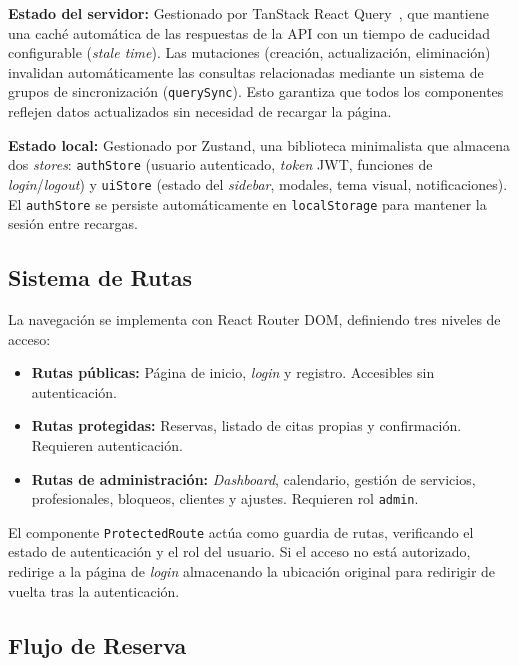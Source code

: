 \textbf{Estado del servidor:} Gestionado por TanStack React Query~\cite{tanstack_query}, que mantiene una cach\'e autom\'atica de las respuestas de la API con un tiempo de caducidad configurable (\textit{stale time}). Las mutaciones (creaci\'on, actualizaci\'on, eliminaci\'on) invalidan autom\'aticamente las consultas relacionadas mediante un sistema de grupos de sincronizaci\'on (\texttt{querySync}). Esto garantiza que todos los componentes reflejen datos actualizados sin necesidad de recargar la p\'agina.

\textbf{Estado local:} Gestionado por Zustand, una biblioteca minimalista que almacena dos \textit{stores}: \texttt{authStore} (usuario autenticado, \textit{token} JWT, funciones de \textit{login}/\textit{logout}) y \texttt{uiStore} (estado del \textit{sidebar}, modales, tema visual, notificaciones). El \texttt{authStore} se persiste autom\'aticamente en \texttt{localStorage} para mantener la sesi\'on entre recargas.

\subsection{Sistema de Rutas}\label{subsec:rutas}

La navegaci\'on se implementa con React Router DOM, definiendo tres niveles de acceso:

\begin{itemize}
    \item \textbf{Rutas p\'ublicas:} P\'agina de inicio, \textit{login} y registro. Accesibles sin autenticaci\'on.
    \item \textbf{Rutas protegidas:} Reservas, listado de citas propias y confirmaci\'on. Requieren autenticaci\'on.
    \item \textbf{Rutas de administraci\'on:} \textit{Dashboard}, calendario, gesti\'on de servicios, profesionales, bloqueos, clientes y ajustes. Requieren rol \texttt{admin}.
\end{itemize}

El componente \texttt{ProtectedRoute} act\'ua como guardia de rutas, verificando el estado de autenticaci\'on y el rol del usuario. Si el acceso no est\'a autorizado, redirige a la p\'agina de \textit{login} almacenando la ubicaci\'on original para redirigir de vuelta tras la autenticaci\'on.

\subsection{Flujo de Reserva}\label{subsec:flujo-reserva}

